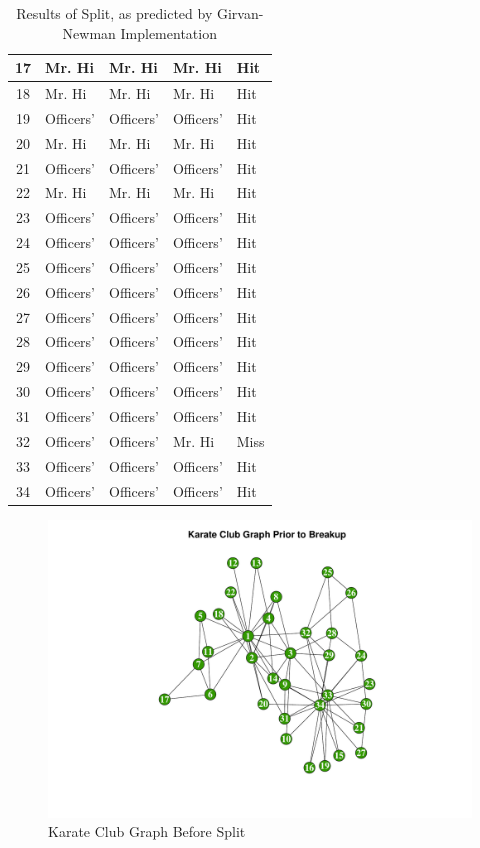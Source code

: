 \documentclass[letterpaper,11pt]{article}
\begin{document}
\begin{table}
\begin{tabular}{ | c | p{2cm} | p{2cm} | p{2cm} | p{2cm} | }
\hline
17 & Mr. Hi & Mr. Hi & Mr. Hi & Hit \\
\hline
18 & Mr. Hi & Mr. Hi & Mr. Hi & Hit \\
\hline
19 & Officers' & Officers' & Officers' & Hit \\
\hline
20 & Mr. Hi & Mr. Hi & Mr. Hi & Hit \\
\hline
21 & Officers' & Officers' & Officers' & Hit \\
\hline
22 & Mr. Hi & Mr. Hi & Mr. Hi & Hit \\
\hline
23 & Officers' & Officers' & Officers' & Hit \\
\hline
24 & Officers' & Officers' & Officers' & Hit \\
\hline
25 & Officers' & Officers' & Officers' & Hit \\
\hline
26 & Officers' & Officers' & Officers' & Hit \\
\hline
27 & Officers' & Officers' & Officers' & Hit \\
\hline
28 & Officers' & Officers' & Officers' & Hit \\
\hline
29 & Officers' & Officers' & Officers' & Hit \\
\hline
30 & Officers' & Officers' & Officers' & Hit \\
\hline
31 & Officers' & Officers' & Officers' & Hit \\
\hline
32 & Officers' & Officers' & Mr. Hi & Miss \\
\hline
33 & Officers' & Officers' & Officers' & Hit \\
\hline
34 & Officers' & Officers' & Officers' & Hit \\
\hline
\end{tabular}
\caption{Results of Split, as predicted by Girvan-Newman Implementation}
\label{tab:results}
\end{table}

\clearpage
\begin{figure}[h]
\includegraphics[scale=0.5]{club-before.pdf}
\caption{Karate Club Graph Before Split}
\label{fig:club-before}
\end{figure}
\end{document}
